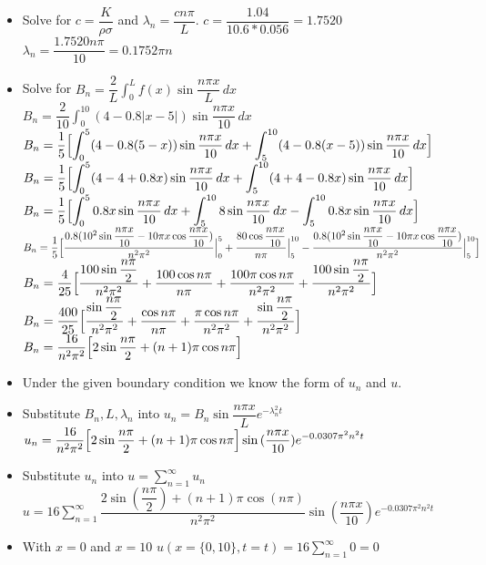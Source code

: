 \documentclass[10pt]{article}
\begin{document}
\begin{itemize}
    \item Solve for $ c = \dfrac{K}{\rho\sigma} $ and $ \lambda_{n} = \dfrac{cn\pi}{L} $.
    \subitem $ c = \dfrac{1.04}{10.6*0.056} = 1.7520 $
    \subitem $ \lambda_{n} = \dfrac{1.7520n\pi}{10} = 0.1752\pi n $
    \item Solve for $ \displaystyle B_{n} = \dfrac{2}{L} \int_{0}^{L} f(x) \sin{\dfrac{n\pi x}{L}} \,dx $
    \subitem $ \displaystyle B_{n} = \dfrac{2}{10} \int_{0}^{10} (4 - 0.8|x-5|) \sin{\dfrac{n\pi x}{10}} \,dx $
    \subitem $ \displaystyle B_{n} = \dfrac{1}{5} \Bigl[ \int_{0}^{5} (4 - 0.8(5-x)) \sin{\dfrac{n\pi x}{10}} \,dx + \int_{5}^{10} (4 - 0.8(x-5)) \sin{\dfrac{n\pi x}{10}} \,dx \Bigr] $
    \subitem $ \displaystyle B_{n} = \dfrac{1}{5} \Bigl[ \int_{0}^{5} (4 -4 + 0.8x) \sin{\dfrac{n\pi x}{10}} \,dx + \int_{5}^{10} (4 + 4 - 0.8x) \sin{\dfrac{n\pi x}{10}} \,dx \Bigr] $
    \subitem $ \displaystyle B_{n} = \dfrac{1}{5} \Bigl[ \int_{0}^{5} 0.8x\sin{\dfrac{n\pi x}{10}} \,dx + \int_{5}^{10} 8\sin{\dfrac{n\pi x}{10}} \,dx - \int_{5}^{10} 0.8x\sin{\dfrac{n\pi x}{10}} \,dx \Bigr] $
    \subitem $ \displaystyle B_{n} = \dfrac{1}{5} \Bigl[ \dfrac{0.8(10^2\sin{\dfrac{n\pi x}{10}} - 10\pi x\cos{\dfrac{n\pi x}{10}})}{n^2\pi^2} \Big|_{0}^{5} + \dfrac{80\cos{\dfrac{n\pi x}{10}}}{n\pi} \Big|_{5}^{10} - \dfrac{0.8(10^2\sin{\dfrac{n\pi x}{10}} - 10\pi x\cos{\dfrac{n\pi x}{10}})}{n^2\pi^2} \Big|_{5}^{10} \Bigr] $
    \subitem $ \displaystyle B_{n} = \dfrac{4}{25} \Bigl[ \dfrac{100\sin{\dfrac{n\pi}{2}}}{n^2\pi^2} + \dfrac{100\cos{n\pi}}{n\pi} + \dfrac{100\pi\cos{n\pi}}{n^2\pi^2} + \dfrac{100\sin{\dfrac{n\pi}{2}}}{n^2\pi^2} \Bigr] $
    \subitem $ \displaystyle B_{n} = \dfrac{400}{25} \Bigl[ \dfrac{\sin{\dfrac{n\pi}{2}}}{n^2\pi^2} + \dfrac{\cos{n\pi}}{n\pi} + \dfrac{\pi\cos{n\pi}}{n^2\pi^2} + \dfrac{\sin{\dfrac{n\pi}{2}}}{n^2\pi^2} \Bigr] $
    \subitem $ \displaystyle B_{n} = \dfrac{16}{n^2\pi^2} \Bigl[ 2\sin{\dfrac{n\pi}{2}} + (n + 1)\pi\cos{n\pi} \Bigr] $
    \item Under the given boundary condition we know the form of $ u_n $ and $ u $.
    \item Substitute $ B_{n}, L, \lambda_{n} $ into $ \displaystyle u_{n} =  B_{n}\sin{\dfrac{n\pi x}{L}}e^{-\lambda_{n}^{2}t}$
    \subitem $ \displaystyle u_{n} = \dfrac{16}{n^2\pi^2} \Bigl[ 2\sin{\dfrac{n\pi}{2}} + (n + 1)\pi\cos{n\pi} \Bigr]\sin{(\dfrac{n\pi x}{10})}e^{-0.0307\pi^2n^{2}t}$
    \item Substitute $ u_n $ into $ \displaystyle u = \sum_{n = 1}^{\infty} u_{n} $
    \subitem $ \displaystyle u = 16\sum_{n = 1}^{\infty} \dfrac{2\sin{(\dfrac{n\pi}{2})} + (n + 1)\pi\cos{(n\pi)}}{n^2\pi^2} \sin{(\dfrac{n\pi x}{10})}e^{-0.0307\pi^2n^{2}t}$
    \item With $ x = 0 $ and $ x = 10 $
    \subitem $ \displaystyle u(x=\{0,10\},t=t) = 16\sum_{n = 1}^{\infty} 0 = 0 $
\end{itemize}
\end{document}
